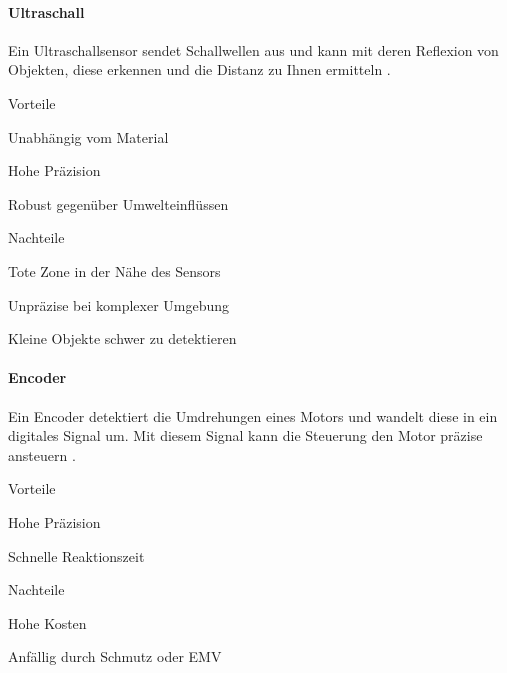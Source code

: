 \documentclass[../main.tex]{subfiles}
\begin{document}
\paragraph{Ultraschall}
Ein Ultraschallsensor sendet Schallwellen aus und kann mit deren Reflexion von Objekten, diese erkennen und die Distanz zu Ihnen ermitteln \cite{ultraschall}.

\begin{minipage}[t]{0.48\textwidth}
\begin{items}
  \item [Vorteile]
  \item Unabhängig vom Material
  \item Hohe Präzision
  \item Robust gegenüber Umwelteinflüssen
\end{items}
\end{minipage}
\hfill
\begin{minipage}[t]{0.48\textwidth}
\begin{items}
  \item [Nachteile]
  \item Tote Zone in der Nähe des Sensors
  \item Unpräzise bei komplexer Umgebung
  \item Kleine Objekte schwer zu detektieren
\end{items}
\end{minipage}

\paragraph{Encoder}
Ein Encoder detektiert die Umdrehungen eines Motors und wandelt diese in ein digitales Signal um. Mit diesem Signal kann die Steuerung den Motor präzise ansteuern \cite{encoder}.
 

\begin{minipage}[t]{0.48\textwidth}
\begin{items}
  \item [Vorteile]
  \item Hohe Präzision
  \item Schnelle Reaktionszeit
\end{items}
\end{minipage}
\hfill
\begin{minipage}[t]{0.48\textwidth}
\begin{items}
  \item [Nachteile]
  \item Hohe Kosten
  \item Anfällig durch Schmutz oder EMV
\end{items}
\end{minipage}
\end{document}
